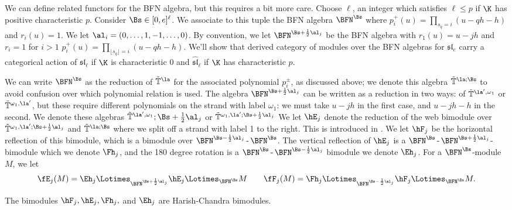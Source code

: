 We can define related functors for the BFN algebra, but this requires
a bit more care.  
Choose $\ell$, an integer which satisfies $\ell \leq p$ if $\K$
has positive characteristic $p$.  Consider $\Bs\in [0,e]^\ell$.  We
associate to this tuple the BFN algebra $\BFN^{\Bs}$ where
$p_i^+(u)=\prod_{s_q=i}(u-qh-h)$ and $r_i(u)=1$.  We let $\al_i=(0,\dots,
1,-1,\dots, 0)$.  By convention, we let $\BFN^{\Bs+\frac 12
  \al_j}$  be the BFN algebra with $r_1(u) =u-jh$ and $r_i=1$ for $i>1$
$p_i^+(u)=\prod_{\lfloor s_q\rfloor =i}(u-qh-h)$.  We'll show that derived category of modules over the BFN algebras for
$\mathfrak{sl}_e$ carry a
categorical action
of $\mathfrak{sl}_\ell$ if $\K$ is characteristic 0 and
$\mathfrak{\widehat{sl}}_\ell$ if $\K$ has characteristic $p$.

We can write $\BFN^\Bs$ as the reduction of $\mathbb{\tilde T}^{\la}$
for the associated polynomial $p_i^{\pm}$, as
discussed above; we denote this algebra $\mathbb{\tilde T}^{\la;\Bs}$
to avoid confusion over which polynomial relation is used.  The algebra $\BFN^{\Bs+\frac 12
  \al_j}$ can be written as a reduction in two ways: of
$\mathbb{\tilde T}^{\la',\omega_1}$ or $\mathbb{\tilde
  T}^{\omega_1,\la'}$, but these require different polynomials on the
strand with label $\omega_1$: we must take
$u-jh$ in the first case, and $u-jh-h$ in the second.  We denote these
algebras $\mathbb{\tilde T}^{\la',\omega_1};\Bs+\frac 12
  \al_j$ or $\mathbb{\tilde
  T}^{\omega_1,\la';\Bs+\frac 12
  \al_j}$
We let $\hE_j$ denote the reduction of the web bimodule over $\mathbb{\tilde
  T}^{\omega_1,\la' ;\Bs+\frac 12
  \al_j}$ and $\mathbb{\tilde T}^{\la;\Bs}$ where we split off a
strand with label 1 to the right.  This is introduced in \cite[Def
3.7]{Webweb}.  We let $\hF_j$ be the horizontal reflection of this
bimodule, which is a bimodule over $\BFN^{\Bs-\frac
  12\al_j}\operatorname{-}\BFN^{\Bs}$.  The vertical reflection of
$\hE_j$ is a
$\BFN^{\Bs}\operatorname{-}\BFN^{\Bs+\frac 12\al_j}$-bimodule which we
denote $\Fh_j$, and the 180 degree rotation is a $\BFN^{\Bs}\operatorname{-}\BFN^{\Bs-\frac
  12\al_j}$ bimodule we denote $\Eh_j$.  For a $\BFN^{\Bs}$-module
$M$, we let
\begin{equation}
\fE_j(M)=\Eh_j\Lotimes_{\BFN^{\Bs+\frac
    12\al_j}}\hE_j\Lotimes_{\BFN^{\Bs}} M\qquad \fF_j(M)=\Fh_j\Lotimes_{\BFN^{\Bs-\frac
    12\al_j}}\hF_j\Lotimes_{\BFN^{\Bs}} M.\label{eq:EF}
\end{equation}
\begin{proposition}
  The bimodules $\hF_j, \hE_j, \Fh_j,$ and $\Eh_j$ are Harish-Chandra
  bimodules. 
\end{proposition}


